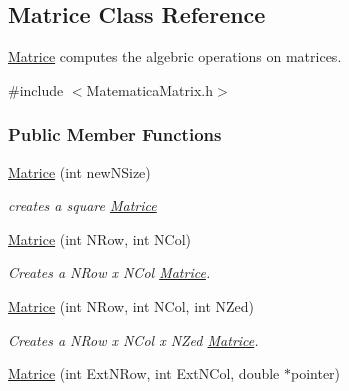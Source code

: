 \hypertarget{classMatrice}{\subsection{\-Matrice \-Class \-Reference}
\label{classMatrice}
}


\hyperlink{classMatrice}{\-Matrice} computes the algebric operations on matrices.  




{\ttfamily \#include $<$\-Matematica\-Matrix.\-h$>$}

\subsubsection*{\-Public \-Member \-Functions}
\begin{DoxyCompactItemize}
\item 
\hypertarget{classMatrice_ae82949ca87c5bb80e83c4c3b5b384ccb}{\hyperlink{classMatrice_ae82949ca87c5bb80e83c4c3b5b384ccb}{\-Matrice} (int new\-N\-Size)}\label{classMatrice_ae82949ca87c5bb80e83c4c3b5b384ccb}

\begin{DoxyCompactList}\small\item\em creates a square \hyperlink{classMatrice}{\-Matrice} \end{DoxyCompactList}\item 
\hypertarget{classMatrice_ad89ff6ea9c7c65c60696b6476c5a48fa}{\hyperlink{classMatrice_ad89ff6ea9c7c65c60696b6476c5a48fa}{\-Matrice} (int \-N\-Row, int \-N\-Col)}\label{classMatrice_ad89ff6ea9c7c65c60696b6476c5a48fa}

\begin{DoxyCompactList}\small\item\em \-Creates a \-N\-Row x \-N\-Col \hyperlink{classMatrice}{\-Matrice}. \end{DoxyCompactList}\item 
\hypertarget{classMatrice_a27514cb639bd3d69242f74cee8146b25}{\hyperlink{classMatrice_a27514cb639bd3d69242f74cee8146b25}{\-Matrice} (int \-N\-Row, int \-N\-Col, int \-N\-Zed)}\label{classMatrice_a27514cb639bd3d69242f74cee8146b25}

\begin{DoxyCompactList}\small\item\em \-Creates a \-N\-Row x \-N\-Col x \-N\-Zed \hyperlink{classMatrice}{\-Matrice}. \end{DoxyCompactList}\item 
\hypertarget{classMatrice_a7c59f8c564cd59391ed6198a75dfd398}{\hyperlink{classMatrice_a7c59f8c564cd59391ed6198a75dfd398}{\-Matrice} (int \-Ext\-N\-Row, int \-Ext\-N\-Col, double $\ast$pointer)}\label{classMatrice_a7c59f8c564cd59391ed6198a75dfd398}


\end{DoxyCompactItemize}
